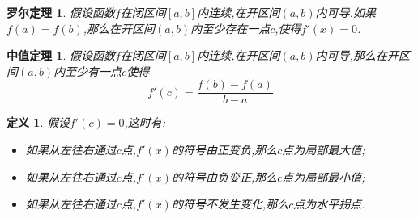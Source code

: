 \documentclass[UTF8,fontset=ubuntu]{ctexart}
\begin{document}
	\theoremstyle{nonumberplain}
	\newtheorem{theorem}{罗尔定理}
	\begin{theorem}
		假设函数$f$在闭区间$[a,b]$内连续,在开区间$(a,b)$内可导.如果$f(a)=f(b)$,那么在开区间$(a,b)$内至少存在一点$c$,使得$f'(x)=0$.
	\end{theorem}
	\newtheorem{theorem1}{中值定理}
	\begin{theorem1}
		假设函数$f$在闭区间$[a,b]$内连续,在开区间$(a,b)$内可导,那么在开区间$(a,b)$内至少有一点$c$使得
		\[
			f'(c)=\frac{f(b)-f(a)}{b-a}
		\]
	\end{theorem1}
	\newtheorem{definition}{定义}
	\begin{definition}
		假设$f'(c)=0$,这时有:
		\begin{itemize}
		\itemsep=0pt
		\parskip=0pt
		\item 如果从左往右通过$c$点,$f'(x)$的符号由正变负,那么$c$点为局部最大值;
		\item 如果从左往右通过$c$点,$f'(x)$的符号由负变正,那么$c$点为局部最小值;
		\item 如果从左往右通过$c$点,$f'(x)$的符号不发生变化,那么$c$点为水平拐点.
		\end{itemize}
	\end{definition}
\end{document}
